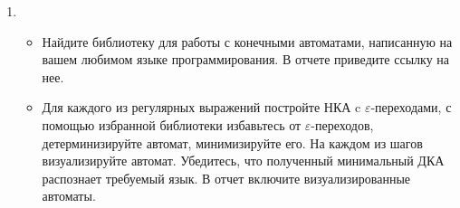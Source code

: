 \documentclass[12pt]{article}
\begin{document}
\begin{enumerate}
  \item 
  { \begin{itemize}
      \item Найдите библиотеку для работы с конечными автоматами, написанную на вашем любимом языке программирования. В отчете приведите ссылку на нее. 
      \item Для каждого из регулярных выражений постройте НКА c $\varepsilon$-переходами, с помощью избранной библиотеки избавьтесь от $\varepsilon$-переходов, детерминизируйте автомат, минимизируйте его. На каждом из шагов визуализируйте автомат. Убедитесь, что полученный минимальный ДКА распознает требуемый язык. В отчет включите визуализированные автоматы.
    \end{itemize}
  }
\end{enumerate}

\end{document}
